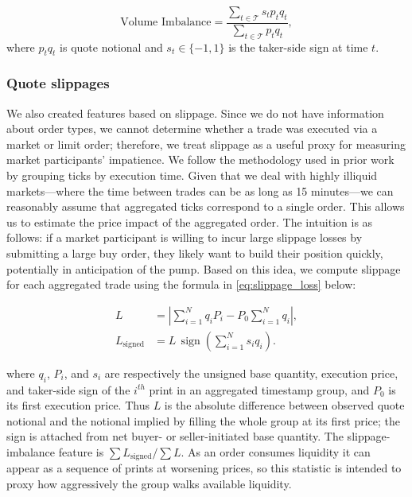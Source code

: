 \documentclass{ieeeaccess}
\begin{document}
\begin{equation}
    \text{Volume Imbalance} = \frac{\sum_{t \in \mathcal{T}}s_t p_t q_t}{\sum_{t \in \mathcal{T}}p_t q_t},
    \label{eq:volume_imbalance}
\end{equation}
where $p_tq_t$ is quote notional and $s_t\in\{-1,1\}$ is the taker-side sign at time $t$.

\subsubsection{Quote slippages}

We also created features based on slippage. Since we do not have information about order types, we cannot determine whether a trade was executed via a market or limit order; therefore, we treat slippage as a useful proxy for measuring market participants’ impatience. We follow the methodology used in prior work by grouping ticks by execution time. Given that we deal with highly illiquid markets—where the time between trades can be as long as 15 minutes—we can reasonably assume that aggregated ticks correspond to a single order. This allows us to estimate the price impact of the aggregated order. The intuition is as follows: if a market participant is willing to incur large slippage losses by submitting a large buy order, they likely want to build their position quickly, potentially in anticipation of the pump. Based on this idea, we compute slippage for each aggregated trade using the formula in \eqref{eq:slippage_loss} below:

\begin{equation}
    \begin{aligned}
        L &= \left|\sum_{i=1}^{N} q_i P_i-P_0\sum_{i=1}^{N}q_i\right|, \\
        L_{\mathrm{signed}} &= L\,\operatorname{sign}\!\left(\sum_{i=1}^{N}s_iq_i\right).
    \end{aligned}
    \label{eq:slippage_loss}
\end{equation}

where $q_i$, $P_i$, and $s_i$ are respectively the unsigned base quantity, execution price, and taker-side sign of the $i^{th}$ print in an aggregated timestamp group, and $P_0$ is its first execution price. Thus $L$ is the absolute difference between observed quote notional and the notional implied by filling the whole group at its first price; the sign is attached from net buyer- or seller-initiated base quantity. The slippage-imbalance feature is $\sum L_{\mathrm{signed}}/\sum L$. As an order consumes liquidity it can appear as a sequence of prints at worsening prices, so this statistic is intended to proxy how aggressively the group walks available liquidity.
\end{document}
